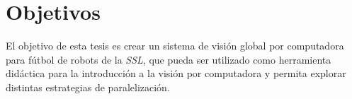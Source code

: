 
\section{Objetivos}

El objetivo de esta tesis es crear un sistema de visión global por computadora
para fútbol de robots de la \emph{SSL}, que pueda ser utilizado como herramienta
didáctica para la introducción a la visión por computadora y permita explorar
distintas estrategias de paralelización.

